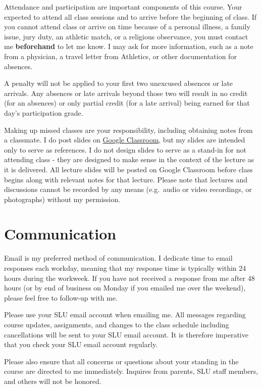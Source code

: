 \documentclass[]{book}
\theoremstyle{definition}
\theoremstyle{definition}
\theoremstyle{definition}
\theoremstyle{remark}
\begin{document}
Attendance and participation are important components of this course.
Your expected to attend all class sessions and to arrive before the
beginning of class. If you cannot attend class or arrive on time because
of a personal illness, a family issue, jury duty, an athletic match, or
a religious observance, you must contact me \textbf{beforehand} to let
me know. I may ask for more information, such as a note from a
physician, a travel letter from Athletics, or other documentation for
absences.

A penalty will not be applied to your first two unexcused absences or
late arrivals. Any absences or late arrivals beyond those two will
result in no credit (for an absences) or only partial credit (for a late
arrival) being earned for that day's participation grade.

Making up missed classes are your responsibility, including obtaining
notes from a classmate. I do post slides on
\href{https://classroom.google.com}{Google Classroom}, but my slides are
intended only to serve as references. I do not design slides to serve as
a stand-in for not attending class - they are designed to make sense in
the context of the lecture as it is delivered. All lecture slides will
be posted on Google Classroom before class begins along with relevant
notes for that lecture. Please note that lectures and discussions cannot
be recorded by any means (e.g.~audio or video recordings, or
photographs) without my permission.

\hypertarget{communication}{%
\section{Communication}\label{communication}}

Email is my preferred method of communication. I dedicate time to email
responses each workday, meaning that my response time is typically
within 24 hours during the workweek. If you have not received a response
from me after 48 hours (or by end of business on Monday if you emailed
me over the weekend), please feel free to follow-up with me.

Please use your SLU email account when emailing me. All messages
regarding course updates, assignments, and changes to the class schedule
including cancellations will be sent to your SLU email account. It is
therefore imperative that you check your SLU email account regularly.

Please also ensure that all concerns or questions about your standing in
the course are directed to me immediately. Inquires from parents, SLU
staff members, and others will not be honored.
\end{document}
